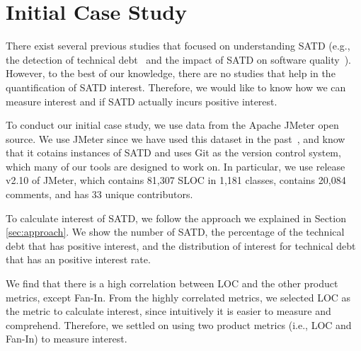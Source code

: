 
\section{Initial Case Study} \label{sec:results}
There exist several previous studies that focused on understanding SATD (e.g., the detection of technical debt~\cite{Potdar2014ICSME,Zazworka2013EASE} and the impact of SATD on software quality~\cite{Wehaibi2016SANER}). However, to the best of our knowledge, there are no studies that help in the quantification of SATD interest. Therefore, we would like to know how we can measure interest and if SATD actually incurs positive interest.

To conduct our initial case study, we use data from the Apache JMeter open source. We use JMeter since we have used this dataset in the past~\cite{Maldonado2015MTD,Potdar2014ICSME}, and know that it cotains instances of SATD and uses Git as the version control system, which many of our tools are designed to work on. In particular, we use release v2.10 of JMeter, which contains 81,307 SLOC in 1,181 classes, contains 20,084 comments, and has 33 unique contributors.





To calculate interest of SATD, we follow the approach we explained in Section \ref{sec:approach}.
We show the number of SATD, the percentage of the technical debt that has positive interest, and the distribution of interest for technical debt that has an positive interest rate.

We find that there is a high correlation between LOC and the other product metrics, except Fan-In. From the highly correlated metrics, we selected LOC as the metric to calculate interest, since intuitively it is easier to measure and comprehend. Therefore, we settled on using two product metrics (i.e., LOC and Fan-In) to measure interest.


